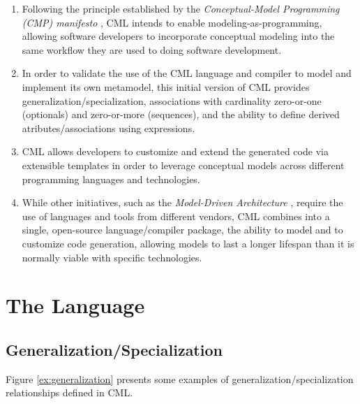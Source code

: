 \documentclass[a0,portrait]{a0poster}
\makeatletter
\newcommand{\verbatimfont}[1]{\renewcommand{\verbatim@font}{\ttfamily#1}}
\makeatother
\begin{document}
\begin{multicols}{3}
\begin{enumerate}
\item Following the principle established by
the \emph{Conceptual-Model Programming (CMP) manifesto} \cite{cmp},
CML intends to enable modeling-as-programming,
allowing software developers to incorporate conceptual modeling
into the same workflow they are used to doing software development.

\item In order to validate the use of the CML language and compiler
to model and implement its own metamodel,
this initial version of CML provides
generalization/specialization,
associations with cardinality zero-or-one (optionals)
and zero-or-more (sequences),
and the ability to define derived atributes/associations
using expressions.

\item CML allows developers to customize and extend
the generated code via extensible templates
in order to leverage conceptual models
across different programming languages and technologies.

\item While other initiatives,
such as the \emph{Model-Driven Architecture} \cite{mda},
require the use of languages and tools from different vendors,
CML combines into a single, open-source language/compiler package,
the ability to model and to customize code generation,
allowing models to last a longer lifespan
than it is normally viable with specific technologies.

\end{enumerate}


\section*{The Language}

\subsection*{Generalization/Specialization}

Figure \ref{ex:generalization} presents some examples of
generalization/specialization relationships defined in CML.

\begin{center}
\verbatimfont{\small}

\label{ex:generalization}
\end{center}


\end{multicols}
\end{document}
